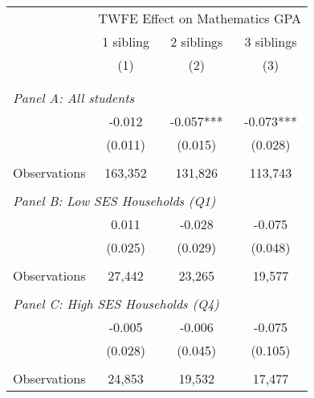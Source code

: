 \makeatletter
{}
{
\makeatother
\begin{tabular}{lccc}
\toprule
\cmidrule(lr){2-4}
& \multicolumn{3}{c}{TWFE Effect on Mathematics GPA} \\
\cmidrule(lr){2-4}
& 1 sibling & 2 siblings & 3 siblings  \\
\cmidrule(lr){2-2} \cmidrule(lr){3-3} \cmidrule(lr){4-4}
& (1) & (2) & (3)\\
\bottomrule
&  &  &  \\
&  &  &   \\
\multicolumn{4}{l}{\textit{Panel A: All students}} \\
\hspace{3mm}        &      -0.012   &      -0.057***&      -0.073***\\
                    &     (0.011)   &     (0.015)   &     (0.028)   \\
                    &               &               &               \\
\hspace{3mm}Observations&     163,352   &     131,826   &     113,743   \\
 
&  &  &   \\
\multicolumn{4}{l}{\textit{Panel B: Low SES Households (Q1)}} \\
\hspace{3mm}        &       0.011   &      -0.028   &      -0.075   \\
                    &     (0.025)   &     (0.029)   &     (0.048)   \\
                    &               &               &               \\
\hspace{3mm}Observations&      27,442   &      23,265   &      19,577   \\
 
&  &  &   \\
\multicolumn{4}{l}{\textit{Panel C: High SES Households (Q4)}} \\
\hspace{3mm}        &      -0.005   &      -0.006   &      -0.075   \\
                    &     (0.028)   &     (0.045)   &     (0.105)   \\
                    &               &               &               \\
\hspace{3mm}Observations&      24,853   &      19,532   &      17,477   \\
 

\end{tabular}}
